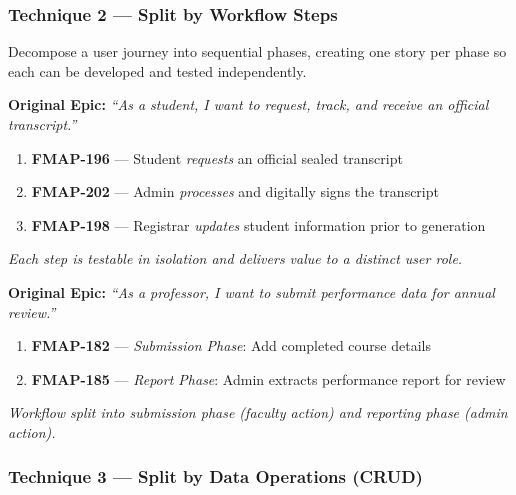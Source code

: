 \documentclass[12pt,a4paper]{article}
\begin{document}
\vspace{10pt}
\subsubsection{Technique 2 --- Split by Workflow Steps}

Decompose a user journey into sequential phases, creating one story per phase so each can be developed and tested independently.

\vspace{6pt}
\begin{tcolorbox}[storybox,title={\textbf{Example 2a: Transcript Management (Facilities Module)}},fonttitle=\bfseries\color{agileblue}]
\textbf{Original Epic:} \textit{``As a student, I want to request, track, and receive an official transcript.''}
\vspace{4pt}
\begin{enumerate}[itemsep=2pt]
\item \textbf{FMAP-196} --- Student \textit{requests} an official sealed transcript
\item \textbf{FMAP-202} --- Admin \textit{processes} and digitally signs the transcript
\item \textbf{FMAP-198} --- Registrar \textit{updates} student information prior to generation
\end{enumerate}
\textit{Each step is testable in isolation and delivers value to a distinct user role.}
\end{tcolorbox}

\vspace{6pt}
\begin{tcolorbox}[storybox,title={\textbf{Example 2b: Performance Tracking (Staff Module)}},fonttitle=\bfseries\color{agileblue}]
\textbf{Original Epic:} \textit{``As a professor, I want to submit performance data for annual review.''}
\vspace{4pt}
\begin{enumerate}[itemsep=2pt]
\item \textbf{FMAP-182} --- \textit{Submission Phase}: Add completed course details
\item \textbf{FMAP-185} --- \textit{Report Phase}: Admin extracts performance report for review
\end{enumerate}
\textit{Workflow split into submission phase (faculty action) and reporting phase (admin action).}
\end{tcolorbox}

\vspace{10pt}
\subsubsection{Technique 3 --- Split by Data Operations (CRUD)}
\end{document}
